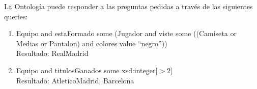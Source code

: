 \documentclass{article}
\begin{document}
La Ontología puede responder a las preguntas pedidas a través de las siguientes queries:
\begin{enumerate}[itemsep=2pt, topsep=0pt]
 \item Equipo and estaFormado some (Jugador and viste some ((Camiseta or Medias or Pantalon) and colores value \textquotedblleft negro\textquotedblright))
  \\Resultado: RealMadrid
 \item Equipo and titulosGanados some xsd:integer[$>$2]
  \\Resultado: AtleticoMadrid, Barcelona
\end{enumerate}
\end{document}
